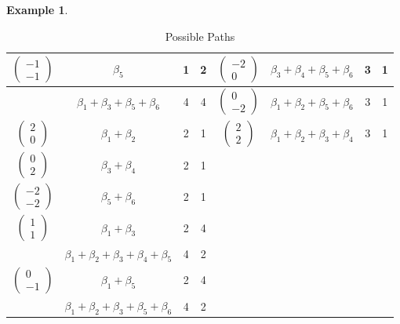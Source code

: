 \documentclass[reqno, 12pt]{amsart}
\theoremstyle{definition}
\newtheorem{example}[theorem]{Example}
\numberwithin{equation}{section}
\begin{document}
\begin{example}
\begin{table}[ht!]
\begin{center}
\begin{tabular}{ |c|c|c|c||c|c|c|c| }
\hline
$\begin{pmatrix}-1\\-1\end{pmatrix}$ & $\beta_5$ & 1 &2 & $\begin{pmatrix}-2\\0\end{pmatrix}$ & $\beta_3+\beta_4+\beta_5+\beta_6$ &  3& 1\\
\hline
& $\beta_1+\beta_3+\beta_5+\beta_6$ & 4& 4 &$\begin{pmatrix}0\\-2\end{pmatrix}$ & $\beta_1+\beta_2+\beta_5+\beta_6$ & 3& 1\\
\hline
$\begin{pmatrix}2\\0\end{pmatrix}$ & $\beta_1+\beta_2$ & 2 &1 &$\begin{pmatrix}2\\2\end{pmatrix}$ & $\beta_1+\beta_2+\beta_3+\beta_4$ & 3& 1\\
\hline
$\begin{pmatrix}0\\2\end{pmatrix}$ & $\beta_3+\beta_4$ & 2 &1& & & &\\
\hline
$\begin{pmatrix}-2\\-2\end{pmatrix}$ & $\beta_5+\beta_6$ & 2 &1& & & &\\
\hline
$\begin{pmatrix}1\\1\end{pmatrix}$ & $\beta_1+\beta_3$ & 2 &4& & & &\\
\hline
 & $\beta_1+\beta_2+\beta_3+\beta_4+\beta_5$ & 4 &2& & & &\\
\hline
$\begin{pmatrix}0\\-1\end{pmatrix}$ & $\beta_1+\beta_5$ & 2 &4& & & & \\
\hline
& $\beta_1+\beta_2+\beta_3+\beta_5+\beta_6$ & 4 & 2& & & & \\
\hline
\end{tabular}
\end{center}
\caption{Possible Paths}
\label{Tab:PathsInRevEngineer}
\end{table}

\begin{figure}
\begin{tikzpicture}[scale=1.2]


\end{tikzpicture}
\end{figure}
\end{example}
\end{document}

